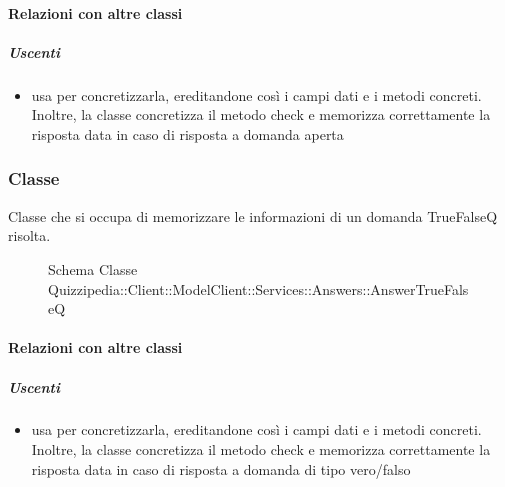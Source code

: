 \paragraph{Relazioni con altre classi}
\subparagraph{Uscenti}
\begin{itemize}
\item usa  per concretizzarla, ereditandone così i campi dati e i metodi concreti. Inoltre, la classe concretizza il metodo check e memorizza correttamente la risposta data in caso di risposta a domanda aperta
\end{itemize}
\subsubsection{Classe }
Classe che si occupa di memorizzare le informazioni di un domanda TrueFalseQ risolta.
\begin{figure}[H]
\centering
\noindent{}
\caption[Schema Classe AnswerTrueFalseQ]{Schema Classe Quizzipedia::Client::ModelClient::Services::Answers::AnswerTrueFalseQ}
\end{figure}
\paragraph{Relazioni con altre classi}
\subparagraph{Uscenti}
\begin{itemize}
\item usa  per concretizzarla, ereditandone così i campi dati e i metodi concreti. Inoltre, la classe concretizza il metodo check e memorizza correttamente la risposta data in caso di risposta a domanda di tipo vero/falso
\end{itemize}
